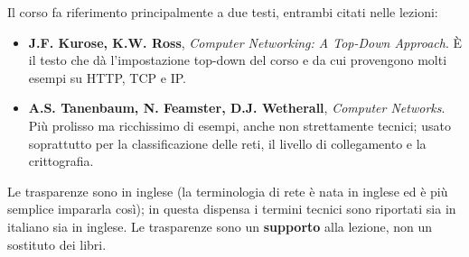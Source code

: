 Il corso fa riferimento principalmente a due testi, entrambi citati nelle lezioni:

\begin{itemize}
    \item \textbf{J.F. Kurose, K.W. Ross}, \emph{Computer Networking: A Top-Down Approach}. È il testo
          che dà l'impostazione top-down del corso e da cui provengono molti esempi su HTTP, TCP e IP.
    \item \textbf{A.S. Tanenbaum, N. Feamster, D.J. Wetherall}, \emph{Computer Networks}. Più prolisso
          ma ricchissimo di esempi, anche non strettamente tecnici; usato soprattutto per la
          classificazione delle reti, il livello di collegamento e la crittografia.
\end{itemize}

Le trasparenze sono in inglese (la terminologia di rete è nata in inglese ed è più semplice
impararla così); in questa dispensa i termini tecnici sono riportati sia in italiano sia in
inglese. Le trasparenze sono un \textbf{supporto} alla lezione, non un sostituto dei libri.

